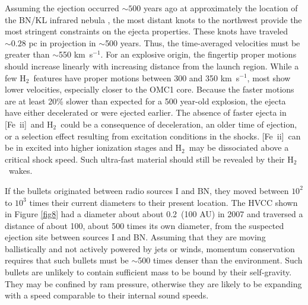 \documentclass{aa}
\newcommand{\kms}{km~s{$^{-1}$}}
\newcommand{\Feii}{[Fe~{\sc ii}]}
\newcommand{\hh}{\ensuremath{\textrm{H}_{2}}}			%
\begin{document}
Assuming the ejection occurred $\sim500$ years ago at approximately the
location of the BN/KL infrared nebula 
\citep{BallyZinnecker2005,Zapata2009,Bally2011,Goddi2011},
the most distant knots to the northwest provide the most stringent 
constraints on the ejecta properties.    These knots have traveled
$\sim0.28$ pc in projection in $\sim$500 years.  Thus,  the time-averaged 
velocities must be greater than  $\sim$550 \kms.   For an explosive origin, 
the fingertip proper motions should increase linearly with increasing distance 
from the launch region.    While a few \hh\ features have proper motions between 300
and 350 \kms ,  most show lower velocities, especially closer to the OMC1 core.   
Because the faster motions are at least 20\% slower than expected for a 500 
year-old explosion,   the ejecta  have either decelerated or were ejected earlier.   
The absence of faster ejecta in \Feii\  and \hh\  could be a consequence of deceleration,
an older time of ejection, or a selection effect resulting from excitation 
conditions in the shocks.       \Feii\ can be in excited into higher ionization stages and 
\hh\  may be dissociated above a critical shock speed.     Such ultra-fast  
material  should  still be revealed by their \hh\  wakes.  

If the bullets  originated  between radio sources I and BN,  they moved 
between $10^2$ to $10^3$ times their current diameters  to their present location.
The HVCC shown  in Figure \ref{fig8} had a  diameter about about 
0.2\arcsec\ (100 AU) in 2007 and traversed a distance of about 100\arcsec ,  
about 500 times its own diameter,  from the suspected ejection site between 
sources I and BN.     Assuming that they are moving ballistically and not actively 
powered by  jets or winds, momentum conservation requires that such bullets must 
be $\sim$500 times  denser than the environment.    Such bullets are unlikely to 
contain sufficient mass to be bound by their self-gravity.   They may be confined 
by ram pressure, otherwise they are  likely to be expanding with a speed 
comparable to their  internal sound speeds.    
\end{document}
